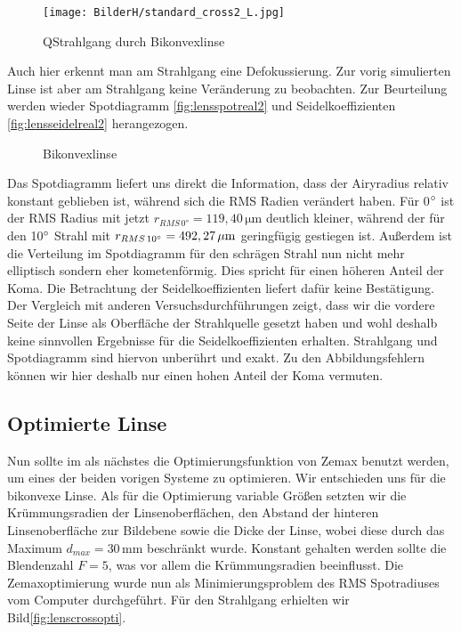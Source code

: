 \documentclass[twoside,colorback,accentcolor=tud4c,11pt]{tudreport}
\begin{document}
	\begin{figure}[H]
\centering
   	\begin{minipage}[b]{\textwidth}
\centering   	

\texttt{[image: BilderH/standard\_cross2\_L.jpg]}
   	\caption{QStrahlgang durch Bikonvexlinse}\label{fig:lenscrossreal2}
  	\end{minipage}
\end{figure}
	
	Auch hier erkennt man am Strahlgang eine Defokussierung. Zur vorig simulierten Linse ist aber am Strahlgang keine Veränderung zu beobachten. Zur Beurteilung werden wieder Spotdiagramm \ref{fig:lensspotreal2} und Seidelkoeffizienten \ref{fig:lensseidelreal2} herangezogen.
	
	\begin{figure}[H]
\centering
  \quad
  \quad   
  \caption{Bikonvexlinse}
\end{figure}
	
	Das Spotdiagramm liefert uns direkt die Information, dass der Airyradius relativ konstant geblieben ist, während sich die RMS Radien verändert haben. Für 0$\degree$ ist der RMS Radius mit jetzt $r_{RMS \, 0°} = 119,40 \mathrm{\,\mu m} $ deutlich kleiner, während der für den 10$\degree$ Strahl mit $r_{RMS \, 10\degree} = 492,27 \mathrm{\,\mu m}$ geringfügig gestiegen ist. Außerdem ist die Verteilung im Spotdiagramm für den schrägen Strahl nun nicht mehr elliptisch sondern eher kometenförmig. Dies spricht für einen höheren Anteil der Koma. Die Betrachtung der Seidelkoeffizienten liefert dafür keine Bestätigung. Der Vergleich mit anderen Versuchsdurchführungen zeigt, dass wir die vordere Seite der Linse als Oberfläche der Strahlquelle gesetzt haben und wohl deshalb keine sinnvollen Ergebnisse für die Seidelkoeffizienten erhalten. Strahlgang und Spotdiagramm sind hiervon unberührt und exakt. Zu den Abbildungsfehlern können wir hier deshalb nur einen hohen Anteil der Koma vermuten.	
	
	\subsection{Optimierte Linse}	
	Nun sollte im als nächstes die Optimierungsfunktion von Zemax benutzt werden, um eines der beiden vorigen Systeme zu optimieren. Wir entschieden uns für die bikonvexe Linse. Als für die Optimierung variable Größen setzten wir die Krümmungsradien der Linsenoberflächen, den Abstand der hinteren Linsenoberfläche zur Bildebene sowie die Dicke der Linse, wobei diese durch das Maximum $d_{max} = 30\mathrm{\,mm}$ beschränkt wurde. Konstant gehalten werden sollte die Blendenzahl $F =5$, was vor allem die Krümmungsradien beeinflusst. Die Zemaxoptimierung wurde nun als Minimierungsproblem des RMS Spotradiuses vom Computer durchgeführt. Für den Strahlgang erhielten wir Bild\ref{fig:lenscrossopti}. 
		
\end{document}
